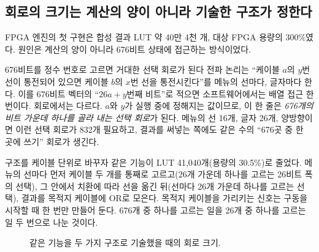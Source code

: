 \subsection{회로의 크기는 계산의 양이 아니라 기술한 구조가 정한다}

FPGA 엔진의 첫 구현은 합성 결과 LUT 약 40만 4천 개, 대상 FPGA 용량의 300\%였다. 원인은 계산의 양이 아니라
676비트 상태에 접근하는 방식이었다.

\begin{lesson}{676비트를 정수 번호로 고르면 거대한 선택 회로가 된다}
전파 논리는 ``케이블 $a$의 $y$번 선이 통전되어 있으면 케이블 $b$의 $x$번 선을 통전시킨다''를 메뉴의 선마다,
글자마다 한다. 이를 676비트 벡터의 ``$26a + y$번째 비트''로 적으면 소프트웨어에서는 배열 접근 한 번이다.
회로에서는 다르다. $a$와 $y$가 실행 중에 정해지는 값이므로, 이 한 줄은 \emph{676개의 비트 가운데 하나를
골라 내는 선택 회로}가 된다. 메뉴의 선 16개, 글자 26개, 양방향이면 이런 선택 회로가 832개 필요하고,
결과를 써넣는 쪽에도 같은 수의 ``676곳 중 한 곳에 쓰기'' 회로가 생긴다.

구조를 케이블 단위로 바꾸자 같은 기능이 LUT 41,040개(용량의 30.5\%)로 줄었다. 메뉴의 선마다 먼저
케이블 두 개를 통째로 고르고(26개 가운데 하나를 고르는 26비트 폭의 선택), 그 안에서 치환에 따라 선을
옮긴 뒤(선마다 26개 가운데 하나를 고르는 선택), 결과를 목적지 케이블에 OR로 모은다. 목적지 케이블을
가리키는 신호는 구동을 시작할 때 한 번만 만들어 둔다. 676개 중 하나를 고르는 일을 26개 중 하나를 고르는
일 두 번으로 나눈 것이다.
\end{lesson}

\begin{figure}[ht]
\centering
{}
\caption{같은 기능을 두 가지 구조로 기술했을 때의 회로 크기.}
\label{fig:lut-bars}
\end{figure}

